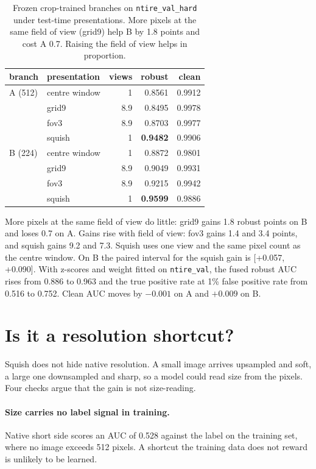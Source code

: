 \documentclass[10pt,twocolumn,letterpaper]{article}
\begin{document}
\begin{table}[t]
\centering
\small
\setlength{\tabcolsep}{4pt}
\begin{tabular}{llrrr}
\toprule
branch & presentation & views & robust & clean \\
\midrule
A (512) & centre window & 1 & 0.8561 & 0.9912 \\
        & grid9 & 8.9 & 0.8495 & 0.9978 \\
        & fov3 & 8.9 & 0.8703 & 0.9977 \\
        & squish & 1 & \textbf{0.9482} & 0.9906 \\
\midrule
B (224) & centre window & 1 & 0.8872 & 0.9801 \\
        & grid9 & 8.9 & 0.9049 & 0.9931 \\
        & fov3 & 8.9 & 0.9215 & 0.9942 \\
        & squish & 1 & \textbf{0.9599} & 0.9886 \\
\bottomrule
\end{tabular}
\caption{Frozen crop-trained branches on \texttt{ntire\_val\_hard} under
test-time presentations. More pixels at the same field of view (grid9) help B
by 1.8 points and cost A 0.7. Raising the field of view helps in proportion.}
\label{tab:probe}
\end{table}

More pixels at the same field of view do little: grid9 gains 1.8 robust
points on B and loses 0.7 on A. Gains rise with field of view: fov3 gains 1.4
and 3.4 points, and squish gains 9.2 and 7.3. Squish uses one view and the
same pixel count as the centre window. On B the paired interval for the
squish gain is [+0.057, +0.090]. With z-scores and weight fitted on
\texttt{ntire\_val}, the fused robust AUC rises from 0.886 to 0.963 and the
true positive rate at 1\% false positive rate from 0.516 to 0.752. Clean AUC
moves by $-0.001$ on A and $+0.009$ on B.

\section{Is it a resolution shortcut?}
\label{sec:controls}

Squish does not hide native resolution. A small image arrives upsampled and
soft, a large one downsampled and sharp, so a model could read size from the
pixels. Four checks argue that the gain is not size-reading.

\paragraph{Size carries no label signal in training.} Native short side scores
an AUC of 0.528 against the label on the training set, where no image exceeds
512 pixels. A shortcut the training data does not reward is unlikely to be
learned.
\end{document}
